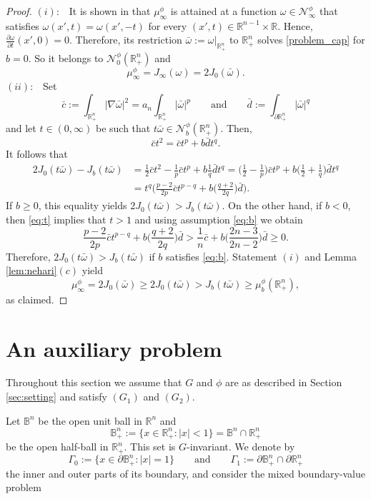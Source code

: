 \documentclass[reqno,11pt,oneside]{amsart}
\numberwithin{equation}{section}
\def\bn{\mathbb{B}^n}
\def\D{\mathbb{B}^n_+}
\def\r{\mathbb{R}}
\def\rn{\mathbb{R}^n}
\def\hn{\mathbb{R}^n_+}
\def\ihn{\int_{\hn}}
\def\idhn{\int_{\partial\hn}}
\def\cN{\mathcal{N}}
\begin{document}
\begin{proof}
$(i):$ \ It is shown in \cite[Corollary 3.4]{c} that $\mu^\phi_\infty$ is attained at a function $\omega\in\cN^\phi_\infty$ that satisfies $\omega(x',t)=\omega(x',-t)$ for every $(x',t)\in\r^{n-1}\times\r$. Hence, $\frac{\partial\omega}{\partial t}(x',0)=0$. Therefore, its restriction $\bar{\omega}:=\omega|_{\hn}$ to $\hn$ solves \eqref{problem_cap} for $b=0$. So it belongs to $\cN_0^\phi(\hn)$ and 
$$\mu^\phi_\infty=J_\infty(\omega)=2J_0(\bar{\omega}).$$
$(ii):$ \ Set
$$\bar{c}:=\ihn|\nabla \bar{\omega}|^2 = {a_n}\ihn|\bar{\omega}|^p\qquad\text{and}\qquad \bar{d}:=\idhn |\bar{\omega}|^q$$
and let $t\in(0,\infty)$ be such that $t\bar{\omega}\in\cN^\phi_b(\hn)$. Then,
\begin{equation}\label{eq:t}
\bar{c}t^2=\bar{c}t^p+b\bar{d}t^q.
\end{equation}
It follows that
\begin{align*}
2J_0(t\bar{\omega})-J_b(t\bar{\omega})&=\frac{1}{2}\bar{c}t^2-\frac{1}{p}\bar{c}t^p+b\frac{1}{q}\bar{d}t^q=\Big(\frac{1}{2}-\frac{1}{p}\Big)\bar{c}t^p+b\Big(\frac{1}{2}+\frac{1}{q}\Big)\bar{d}t^q \\
&=t^q\Big(\frac{p-2}{2p}\bar{c}t^{p-q} + b\Big(\frac{q+2}{2q}\Big)\bar{d}\Big).
\end{align*}
If $b\geq 0$, this equality yields $2J_0(t\bar{\omega})>J_b(t\bar{\omega})$. On the other hand, if $b<0$, then \eqref{eq:t} implies that $t>1$ and using assumption \eqref{eq:b} we obtain
$$\frac{p-2}{2p}\bar{c}t^{p-q} + b\Big(\frac{q+2}{2q}\Big)\bar{d}>\frac{1}{n}\bar{c} + b\Big(\frac{2n-3}{2n-2}\Big)\bar{d}\geq0.$$
Therefore, $2J_0(t\bar{\omega})>J_b(t\bar{\omega})$ if $b$ satisfies \eqref{eq:b}. Statement $(i)$ and Lemma \ref{lem:nehari}$(c)$ yield
$$\mu_\infty^\phi=2J_0(\bar{\omega}) \geq 2J_0(t\bar{\omega}) >J_b(t\bar{\omega})\geq \mu^\phi_b(\hn),$$
as claimed.
\end{proof}

\section{An auxiliary problem}
\label{sec:D}

Throughout this section we assume that $G$ and $\phi$ are as described in Section \ref{sec:setting} and satisfy $(G_1)$ and $(G_2)$.

Let $\bn$ be the open unit ball in $\rn$ and
$$\D:=\{x\in\hn:|x|<1\}=\bn\cap\hn$$
be the open half-ball in $\hn$. This set is $G$-invariant. We denote by
$$\Gamma_0:=\{x\in \partial\D:|x|=1\}\qquad\text{and}\qquad \Gamma_1:=\partial\D\cap\partial\hn$$
the inner and outer parts of its boundary, and consider the mixed boundary-value problem
\end{document}
